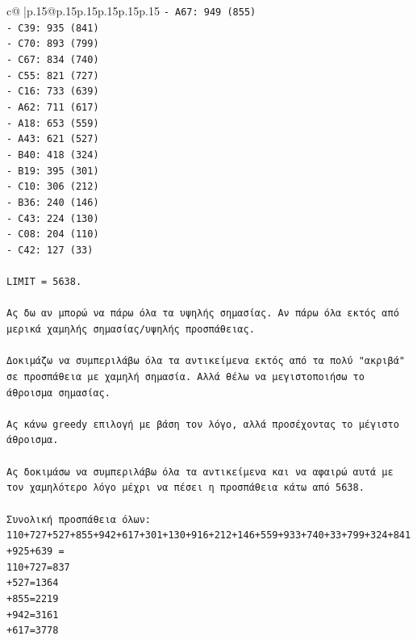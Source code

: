 \documentclass{article}
\begin{document}
{\begin{supertabular}{c@{$\;$}|p{.15\linewidth}@{}p{.15\linewidth}p{.15\linewidth}p{.15\linewidth}p{.15\linewidth}p{.15\linewidth}}
{{{\texttt{{-} A67: 949 (855)} \\
\texttt{{-} C39: 935 (841)} \\
\texttt{{-} C70: 893 (799)} \\
\texttt{{-} C67: 834 (740)} \\
\texttt{{-} C55: 821 (727)} \\
\texttt{{-} C16: 733 (639)} \\
\texttt{{-} A62: 711 (617)} \\
\texttt{{-} A18: 653 (559)} \\
\texttt{{-} A43: 621 (527)} \\
\texttt{{-} B40: 418 (324)} \\
\texttt{{-} B19: 395 (301)} \\
\texttt{{-} C10: 306 (212)} \\
\texttt{{-} B36: 240 (146)} \\
\texttt{{-} C43: 224 (130)} \\
\texttt{{-} C08: 204 (110)} \\
\texttt{{-} C42: 127 (33)} \\
\\ 
\texttt{LIMIT = 5638.} \\
\\ 
\texttt{Ας δω αν μπορώ να πάρω όλα τα υψηλής σημασίας. Αν πάρω όλα εκτός από μερικά χαμηλής σημασίας/υψηλής προσπάθειας.} \\
\\ 
\texttt{Δοκιμάζω να συμπεριλάβω όλα τα αντικείμενα εκτός από τα πολύ "ακριβά" σε προσπάθεια με χαμηλή σημασία. Αλλά θέλω να μεγιστοποιήσω το άθροισμα σημασίας.} \\
\\ 
\texttt{Ας κάνω greedy επιλογή με βάση τον λόγο, αλλά προσέχοντας το μέγιστο άθροισμα.} \\
\\ 
\texttt{Ας δοκιμάσω να συμπεριλάβω όλα τα αντικείμενα και να αφαιρώ αυτά με τον χαμηλότερο λόγο μέχρι να πέσει η προσπάθεια κάτω από 5638.} \\
\\ 
\texttt{Συνολική προσπάθεια όλων: 110+727+527+855+942+617+301+130+916+212+146+559+933+740+33+799+324+841+925+639 = } \\
\texttt{110+727=837} \\
\texttt{+527=1364} \\
\texttt{+855=2219} \\
\texttt{+942=3161} \\
\texttt{+617=3778} \\
}}}
\end{supertabular}}
\end{document}
